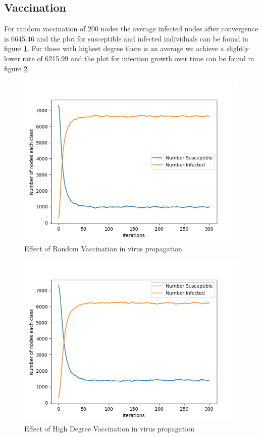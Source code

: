 \documentclass[11pt]{article}
\begin{document}
\subsection{Vaccination}
For random vaccination of 200 nodes the average infected nodes after convergence is 6645.46 and the plot for susceptible and infected individuals can be found  in figure \ref{fig:vacrand}.
For those with highest degree there is an average we achieve a slightly lower rate of 6215.99 and the plot for infection growth over time can be found in figure \ref{fig:highdegree}.
\begin{figure}
    \centering
    \includegraphics{Assignments/Assignment2/random-vac.png}
    \caption{Effect of Random Vaccination in virus propagation}
    \label{fig:vacrand}
\end{figure}
\begin{figure}
    \centering
    \includegraphics{Assignments/Assignment2/high-degree.png}
    \caption{Effect of High Degree Vaccination in virus propagation}
    \label{fig:highdegree}
\end{figure}
\end{document}
